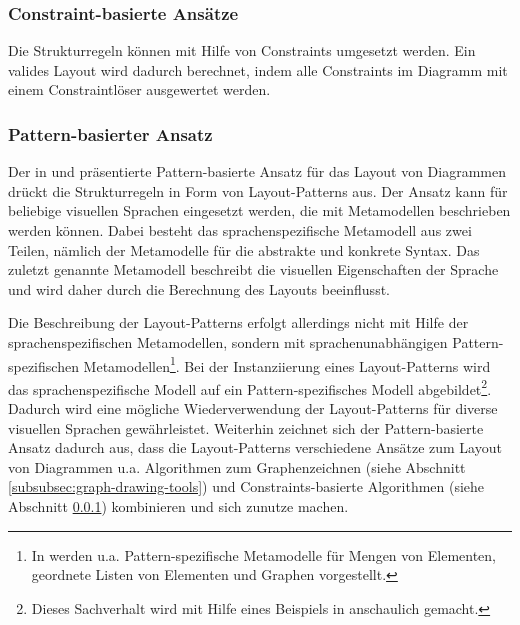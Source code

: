 \subsubsection{Constraint-basierte Ansätze}
\label{subsubsec:constraint-based-approaches}

Die Strukturregeln können mit Hilfe von Constraints umgesetzt werden. Ein valides Layout wird dadurch berechnet, indem alle Constraints im Diagramm mit einem Constraintlöser ausgewertet werden.







\subsubsection{Pattern-basierter Ansatz}
\label{subsubsec:pattern-based-approach}

Der in \cite{Maier12A-Pattern-based} und \cite{MaierMinas10Combination} präsentierte Pattern-basierte Ansatz für das Layout von Diagrammen drückt die Strukturregeln in Form von Layout-Patterns aus. Der Ansatz kann für beliebige visuellen Sprachen eingesetzt werden, die mit Metamodellen beschrieben werden können. Dabei besteht das sprachenspezifische Metamodell aus zwei Teilen, nämlich der Metamodelle für die abstrakte und konkrete Syntax. Das zuletzt genannte Metamodell beschreibt die visuellen Eigenschaften der Sprache und wird daher durch die Berechnung des Layouts beeinflusst.

Die Beschreibung der Layout-Patterns erfolgt allerdings nicht mit Hilfe der sprachenspezifischen Metamodellen, sondern mit sprachenunabhängigen Pattern-spezifischen Metamodel\-len\footnote{In \cite{Maier12A-Pattern-based} werden u.a. Pattern-spezifische Metamodelle für Mengen von Elementen, geordnete Listen von Elementen und Graphen vorgestellt.}. Bei der Instanziierung eines Layout-Patterns wird das sprachenspezifische Modell auf ein Pattern-spezifisches Modell abgebildet\footnote{Dieses Sachverhalt wird mit Hilfe eines Beispiels in \cite[S.59ff]{Maier12A-Pattern-based} anschaulich gemacht.}. Dadurch wird eine mögliche Wiederverwendung der Layout-Patterns für diverse visuellen Sprachen gewährleistet. Weiterhin zeichnet sich der Pattern-basierte Ansatz dadurch aus, dass die Layout-Patterns verschiedene Ansätze zum Layout von Diagrammen u.a. Algorithmen zum Graphenzeichnen (siehe Abschnitt \ref{subsubsec:graph-drawing-tools}) und Constraints-basierte Algorithmen (siehe Abschnitt \ref{subsubsec:constraint-based-approaches}) kombinieren und sich zunutze machen.


